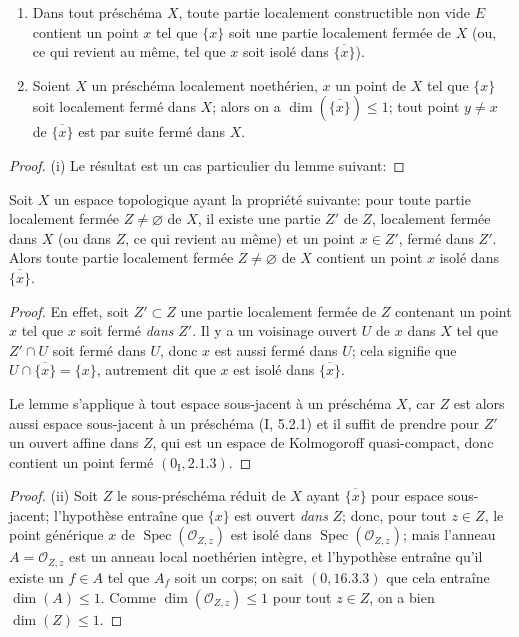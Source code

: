 \begin{proposition}[5.1.10]
\label{IV.2.5.1.10-fr}
\begin{enumerate}
\item[(i)] Dans tout préschéma $X$, toute partie localement constructible non
vide $E$ contient un point $x$ tel que $\{x\}$ soit une partie localement
fermée de $X$ (ou, ce qui revient au même, tel que $x$ soit isolé dans
$\overline{\{x\}}$).
\item[(ii)] Soient $X$ un préschéma localement noethérien, $x$ un point de
$X$ tel que $\{x\}$ soit localement fermé dans $X$; alors on a
$\dim(\overline{\{x\}})\leq1$; tout point $y\ne x$ de
$\overline{\{x\}}$ est par suite fermé dans $X$.
\end{enumerate}
\end{proposition}

\begin{proof}
(i) Le résultat est un cas particulier du lemme suivant:
\end{proof}

\begin{lemma}[5.1.10.1]
\label{IV.2.5.1.10.1-fr}
Soit $X$ un espace topologique ayant la propriété suivante: pour toute partie
localement fermée $Z\ne\varnothing$ de $X$, il existe une partie $Z'$ de $Z$,
localement fermée dans $X$ (ou dans $Z$, ce qui revient au même) et un point
$x\in Z'$, fermé dans $Z'$. Alors toute partie localement fermée
$Z\ne\varnothing$ de $X$ contient un point $x$ isolé dans
$\overline{\{x\}}$.
\end{lemma}

\begin{proof}
En effet, soit $Z'\subset Z$ une partie localement fermée de $Z$ contenant un
point $x$ tel que $x$ soit fermé \emph{dans} $Z'$. Il y a un voisinage ouvert
$U$ de $x$ dans $X$ tel que $Z'\cap U$ soit fermé dans $U$, donc $x$ est aussi
fermé dans $U$; cela signifie que $U\cap\overline{\{x\}}=\{x\}$, autrement
dit que $x$ est isolé dans $\overline{\{x\}}$.

Le lemme s'applique à tout espace sous-jacent à un préschéma $X$, car $Z$ est
alors aussi espace sous-jacent à un préschéma (I, 5.2.1) et il suffit de
prendre pour $Z'$ un ouvert affine dans $Z$, qui est un espace de Kolmogoroff
quasi-compact, donc contient un point fermé $(0_{\mathrm I},2.1.3)$.
\end{proof}


\begin{proof}
\textup{(ii)} Soit $Z$ le sous-préschéma réduit de $X$ ayant
$\overline{\{x\}}$ pour espace
sous-jacent; l'hypothèse entraîne que $\{x\}$ est ouvert \emph{dans} $Z$;
donc, pour tout $z\in Z$, le point générique $x$ de
$\operatorname{Spec}(\mathcal O_{Z,z})$ est isolé dans
$\operatorname{Spec}(\mathcal O_{Z,z})$; mais l'anneau
$A=\mathcal O_{Z,z}$ est un anneau local noethérien intègre, et l'hypothèse
entraîne qu'il existe un $f\in A$ tel que $A_f$ soit un corps; on sait
$(0,16.3.3)$ que cela entraîne $\dim(A)\leq1$. Comme
$\dim(\mathcal O_{Z,z})\leq1$ pour tout $z\in Z$, on a bien $\dim(Z)\leq1$.
\end{proof}

